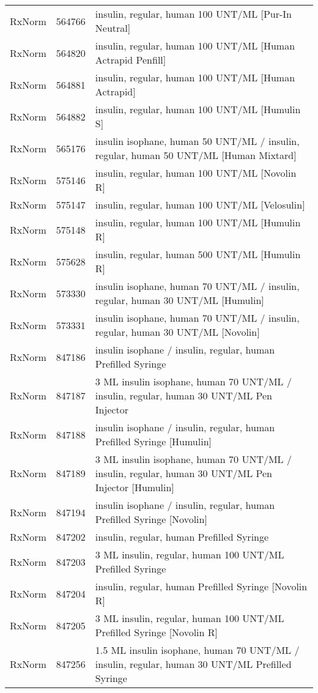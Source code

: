 \begin{longtable}{p{}p{}p{}}
  RxNorm & 564766 & insulin, regular, human 100 UNT/ML [Pur-In Neutral] \\ 
  RxNorm & 564820 & insulin, regular, human 100 UNT/ML [Human Actrapid Penfill] \\ 
  RxNorm & 564881 & insulin, regular, human 100 UNT/ML [Human Actrapid] \\ 
  RxNorm & 564882 & insulin, regular, human 100 UNT/ML [Humulin S] \\ 
  RxNorm & 565176 & insulin isophane, human 50 UNT/ML / insulin, regular, human 50 UNT/ML [Human Mixtard] \\ 
  RxNorm & 575146 & insulin, regular, human 100 UNT/ML [Novolin R] \\ 
  RxNorm & 575147 & insulin, regular, human 100 UNT/ML [Velosulin] \\ 
  RxNorm & 575148 & insulin, regular, human 100 UNT/ML [Humulin R] \\ 
  RxNorm & 575628 & insulin, regular, human 500 UNT/ML [Humulin R] \\ 
  RxNorm & 573330 & insulin isophane, human 70 UNT/ML / insulin, regular, human 30 UNT/ML [Humulin] \\ 
  RxNorm & 573331 & insulin isophane, human 70 UNT/ML / insulin, regular, human 30 UNT/ML [Novolin] \\ 
  RxNorm & 847186 & insulin isophane / insulin, regular, human Prefilled Syringe \\ 
  RxNorm & 847187 & 3 ML insulin isophane, human 70 UNT/ML / insulin, regular, human 30 UNT/ML Pen Injector \\ 
  RxNorm & 847188 & insulin isophane / insulin, regular, human Prefilled Syringe [Humulin] \\ 
  RxNorm & 847189 & 3 ML insulin isophane, human 70 UNT/ML / insulin, regular, human 30 UNT/ML Pen Injector [Humulin] \\ 
  RxNorm & 847194 & insulin isophane / insulin, regular, human Prefilled Syringe [Novolin] \\ 
  RxNorm & 847202 & insulin, regular, human Prefilled Syringe \\ 
  RxNorm & 847203 & 3 ML insulin, regular, human 100 UNT/ML Prefilled Syringe \\ 
  RxNorm & 847204 & insulin, regular, human Prefilled Syringe [Novolin R] \\ 
  RxNorm & 847205 & 3 ML insulin, regular, human 100 UNT/ML Prefilled Syringe [Novolin R] \\ 
  RxNorm & 847256 & 1.5 ML insulin isophane, human 70 UNT/ML / insulin, regular, human 30 UNT/ML Prefilled Syringe \\ 

\end{longtable}
